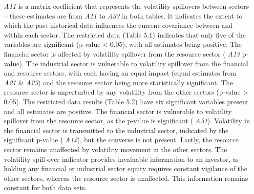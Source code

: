 \documentclass[11pt,preprint, authoryear]{elsarticle}
\numberwithin{equation}{section}
\numberwithin{figure}{section}
\numberwithin{table}{section}
\begin{document}
\emph{A11} is a matrix coefficient that represents the volatility
spillovers between sectors -- these estimates are from \emph{A11} to
\emph{A33} in both tables. It indicates the extent to which the past
historical data influences the current covariance between and within
each sector. The restricted data (Table 5.1) indicates that only five of
the variables are significant (p-value \textless{} 0.05), with all
estimates being positive. The financial sector is affected by volatility
spillover from the resource sector ( \emph{A13} p-value). The industrial
sector is vulnerable to volatility spillover from the financial and
resource sectors, with each having an equal impact (equal estimates from
\emph{A21} \& \emph{A23}) and the resource sector being more
statistically significant. The resource sector is unperturbed by any
volatility from the other sectors (p-value \textgreater{} 0.05). The
restricted data results (Table 5.2) have six significant variables
present and all estimates are positive. The financial sector is
vulnerable to volatility spillover from the resource sector, as the
p-value is significant ( \emph{A31}). Volatility in the financial sector
is transmitted to the industrial sector, indicated by the significant
p-value ( \emph{A12}), but the converse is not present. Lastly, the
resource sector remains unaffected by volatility movement in the other
sectors. The volatility spill-over indicator provides invaluable
information to an investor, as holding any financial or industrial
sector equity requires constant vigilance of the other sectors, whereas
the resource sector is unaffected. This information remains constant for
both data sets.
\end{document}
